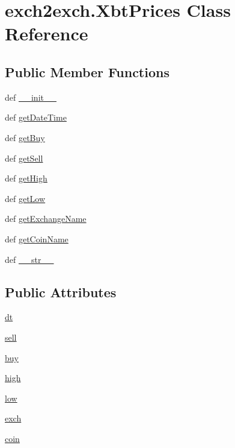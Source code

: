 \hypertarget{classexch2exch_1_1_xbt_prices}{\section{exch2exch.\-Xbt\-Prices Class Reference}
\label{classexch2exch_1_1_xbt_prices}
}
\subsection*{Public Member Functions}
\begin{DoxyCompactItemize}
\item 
def \hyperlink{classexch2exch_1_1_xbt_prices_a58a46b0407bcf03e0b7258fc20ba6de0}{\-\_\-\-\_\-init\-\_\-\-\_\-}
\item 
def \hyperlink{classexch2exch_1_1_xbt_prices_ad1c937977f274b7a8ddb5868825ad592}{get\-Date\-Time}
\item 
def \hyperlink{classexch2exch_1_1_xbt_prices_a6a2f6cbf5d274887ffcbfbe2eb77b358}{get\-Buy}
\item 
def \hyperlink{classexch2exch_1_1_xbt_prices_abcd54a52079952f45b5f29f3ffcd83b5}{get\-Sell}
\item 
def \hyperlink{classexch2exch_1_1_xbt_prices_a173ced43a9edb648a129dfa9ba4a4d66}{get\-High}
\item 
def \hyperlink{classexch2exch_1_1_xbt_prices_a38ab2c32172fd95a1bb9fe103b6d59cd}{get\-Low}
\item 
def \hyperlink{classexch2exch_1_1_xbt_prices_a5c1eb62a961be8c36b93c0b1951d0b8d}{get\-Exchange\-Name}
\item 
def \hyperlink{classexch2exch_1_1_xbt_prices_a657bf3d6e75d3bfe1fe408862b2a78cd}{get\-Coin\-Name}
\item 
def \hyperlink{classexch2exch_1_1_xbt_prices_a5558eba2560c7d37c5308b7071f5c583}{\-\_\-\-\_\-str\-\_\-\-\_\-}
\end{DoxyCompactItemize}
\subsection*{Public Attributes}
\begin{DoxyCompactItemize}
\item 
\hyperlink{classexch2exch_1_1_xbt_prices_af9f916c683c48631c97f1c5d91447751}{dt}
\item 
\hyperlink{classexch2exch_1_1_xbt_prices_a06fd0cfb03d485af3364a0d86fbe5385}{sell}
\item 
\hyperlink{classexch2exch_1_1_xbt_prices_a8f1d8ac0ef114ea3645314578697b7ac}{buy}
\item 
\hyperlink{classexch2exch_1_1_xbt_prices_aeae6235417d65d9e9c768a51c38d5388}{high}
\item 
\hyperlink{classexch2exch_1_1_xbt_prices_a8cef13f833a894d4fc5b8296bb4906fa}{low}
\item 
\hyperlink{classexch2exch_1_1_xbt_prices_a72caf3a29017a1ceaf4367240a46b360}{exch}
\item 
\hyperlink{classexch2exch_1_1_xbt_prices_a1191c8825e8f1333b4100b89fa2be053}{coin}
\end{DoxyCompactItemize}


